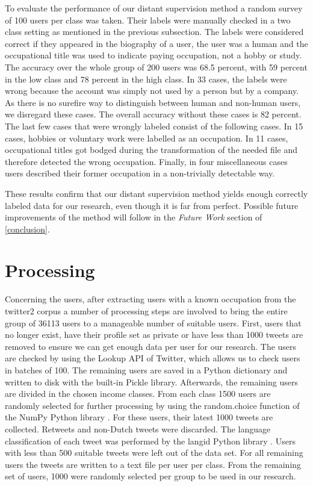 \documentclass[
10pt, %
a4paper, %
oneside, %
headinclude,footinclude, %
] {book}%
\begin{document}
To evaluate the performance of our distant supervision method a random survey of 100 users per class was taken. Their labels were manually checked in a two class setting as mentioned in the previous subsection. The labels were considered correct if they appeared in the biography of a user, the user was a human and the occupational title was used to indicate paying occupation, not a hobby or study. The accuracy over the whole group of 200 users was 68.5 percent, with 59 percent in the low class and 78 percent in the high class. In 33 cases, the labels were wrong because the account was simply not used by a person but by a company. As there is no surefire way to distinguish between human and non-human users, we disregard these cases. The overall accuracy without these cases is 82 percent. The last few cases that were wrongly labeled consist of the following cases. In 15 cases, hobbies or voluntary work were labelled as an occupation. In 11 cases, occupational titles got bodged during the transformation of the needed file and therefore detected the wrong occupation. Finally, in four miscellaneous cases users described their former occupation in a non-trivially detectable way.

These results confirm that our distant supervision method yields enough correctly labeled data for our research, even though it is far from perfect. Possible future improvements of the method will follow in the \textit{Future Work} section of \autoref{conclusion}.


\section{Processing}
\label{sec:processing}
Concerning the users, after extracting users with a known occupation from the twitter2 corpus a number of processing steps are involved to bring the entire group of 36113 users to a manageable number of suitable users. First, users that no longer exist, have their profile set as private or have less than 1000 tweets are removed to ensure we can get enough data per user for our research. The users are checked by using the Lookup API of Twitter, which allows us to check users in batches of 100. The remaining users are saved in a Python dictionary and written to disk with the built-in Pickle library. Afterwards, the remaining users are divided in the chosen income classes. From each class 1500 users are randomly selected for further processing by using the random.choice function of the NumPy Python library \citep{numpy}. For these users, their latest 1000 tweets are collected. Retweets and non-Dutch tweets were discarded. The language classification of each tweet was performed by the langid Python library \citep{langid}. Users with less than 500 suitable tweets were left out of the data set. For all remaining users the tweets are written to a text file per user per class. From the remaining set of users, 1000 were randomly selected per group to be used in our research.
\end{document}
